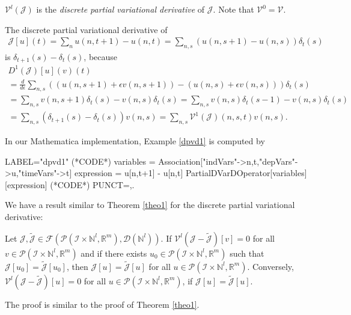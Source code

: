 \documentclass[runningheads]{llncs}
\newcommand{\Rr}{\mathbb{R}}
\newcommand{\Nn}{\mathbb{N}}
\newcommand{\1}{\chi}
\newcommand{\Ii}{\mathcal{I}}
\begin{document}
\normalsize
\begin{definition}
$\mathcal{V}^l(\mathcal{J})$ is the \emph{discrete partial variational derivative} of $\mathcal{J}$.
	Note that $\mathcal{V}^0=\mathcal{V}$.
\end{definition}
\begin{example}
	\label{dpvd1}
	The discrete partial variational derivative of 
	\begin{gather*}
		\mathcal{J}[u](t)=\sum_nu(n,t+1)-u(n,t)=\sum_{n,s}(u(n,s+1)-u(n,s))\delta_t(s)
	\end{gather*}
	is $\delta_{t+1}(s)-\delta_t(s)$, because
	\small
	\begin{gather*}
		D^1(\mathcal{J})[u](v)(t)\\
		=\frac{d}{d\epsilon} \sum_{n,s}((u(n,s+1)+\epsilon v(n,s+1))-(u(n,s)+\epsilon v(n,s)))\delta_t(s)\\
		=\sum_{n,s}v(n,s+1)\delta_t(s)-v(n,s)\delta_t(s)=\sum_{n,s}v(n,s)\delta_t(s-1)-v(n,s)\delta_t(s)\\
		=\sum_{n,s}(\delta_{t+1}(s)-\delta_t(s))v(n,s)=\sum_{n,s}\mathcal{V}^1(\mathcal{J})(n,s,t)v(n,s).
	\end{gather*}
	\normalsize
\end{example}
\begin{example}
	In our {\sc Mathematica} implementation, Example \ref{dpvd1} is computed by
	\begin{EXE}
		LABEL="dpvd1"
		(*CODE*)
		variables = Association["indVars"->{n,t},"depVars"->{u},"timeVars"->{t}]
		expression = u[n,t+1] - u[n,t]
		PartialDVarDOperator[variables][expression]
		(*CODE*)
		PUNCT={,.}
	\end{EXE}	
	\begin{small}
		
		
	\end{small}
\end{example}
We have a result similar to Theorem \ref{theo1} for the discrete partial variational derivative:
\begin{theorem}\label{theo2}
	Let $\mathcal{J},\tilde{\mathcal{J}}\in \mathcal{F}(\mathcal{P}(\Ii\times\Nn^l,\Rr^m),\mathcal{D}(\Nn^l))$. If $\mathcal{V}^l(\mathcal{J}-\tilde{\mathcal{J}})[v]=0$ for all $v\in\mathcal{P}(\Ii\times\Nn^l,\Rr^m)$ and if there exists $u_0\in\mathcal{P}(\Ii\times\Nn^l,\Rr^m)$ such that $\mathcal{J}[u_0]=\tilde{\mathcal{J}}[u_0]$, then
	$\mathcal{J}[u]=\tilde{\mathcal{J}}[u]$
	for all $u\in\mathcal{P}(\Ii\times\Nn^l,\Rr^m)$.
	Conversely,
	$\mathcal{V}^l(\mathcal{J}-\tilde{\mathcal{J}})[u]=0$
	for all $u\in\mathcal{P}(\Ii\times\Nn^l,\Rr^m)$, if $\mathcal{J}[u]=\tilde{\mathcal{J}}[u]$.
\end{theorem}
The proof is similar to the proof of Theorem \ref{theo1}.
\end{document}
